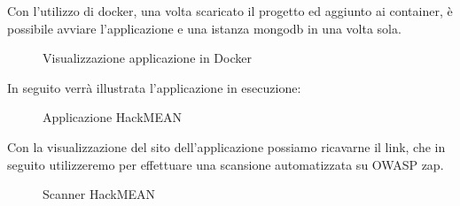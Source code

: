 Con l’utilizzo di docker, una volta scaricato il progetto ed aggiunto ai container,  è possibile avviare l’applicazione e una istanza mongodb in una volta sola.
\begin{figure}[H]
    \caption{Visualizzazione applicazione in Docker}
    \label{fig:Docker}
\end{figure}
In seguito verrà illustrata l’applicazione in esecuzione: 
\begin{figure}[H]
    \caption{Applicazione HackMEAN}
    \label{fig:HackMEAN}
\end{figure}
Con la visualizzazione del sito dell’applicazione possiamo ricavarne il link, che in seguito utilizzeremo per effettuare una scansione automatizzata su OWASP zap.
\begin{figure}[H]
    \caption{Scanner HackMEAN}
    \label{fig:HackMEANScan}
\end{figure}

